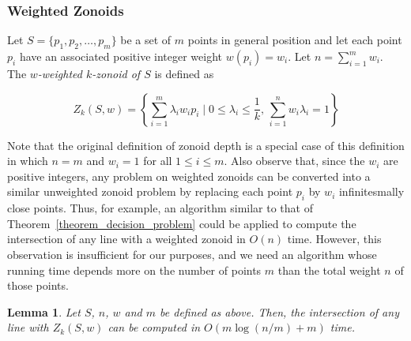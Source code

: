 \documentclass{elsart}
\newtheorem{lemma}{Lemma}
\begin{document}
\subsubsection{Weighted Zonoids}
\label{section_decision}

Let $S = \{p_1, p_2, \ldots, p_m\}$ be a set of $m$ points in general
position and let each point $p_i$ have an associated positive integer
weight $w(p_i)=w_i$.  Let $n=\sum_{i=1}^m w_i$.  The \emph{$w$-weighted
$k$-zonoid of $S$} is defined as

\[ Z_k(S,w) = \left\{\sum_{i=1}^{m}\lambda_iw_ip_i \mid 0 \le
\lambda_i \le \frac{1}{k},\, \sum_{i=1}^{n} w_i\lambda_i = 1 \right\} \]

Note that the original definition of zonoid depth is a special case of
this definition in which $n=m$ and $w_i=1$ for all $1\le i\le m$.
Also observe that, since the $w_i$ are positive integers, any problem
on weighted zonoids can be converted into a similar unweighted zonoid
problem by replacing each point $p_i$ by $w_i$ infinitesmally close
points. Thus, for example, an algorithm similar to that of
Theorem~\ref{theorem_decision_problem} could be applied to compute the
intersection of any line with a weighted zonoid in $O(n)$ time.
However, this observation is insufficient for our purposes, and we
need an algorithm whose running time depends more on the number of
points $m$ than the total weight $n$ of those points.

\begin{lemma}
Let $S$, $n$, $w$ and $m$ be defined as above.  Then, the intersection
of any line with $Z_k(S,w)$ can be computed in $O(m\log (n/m) + m)$
time.
\end{lemma}
\end{document}
